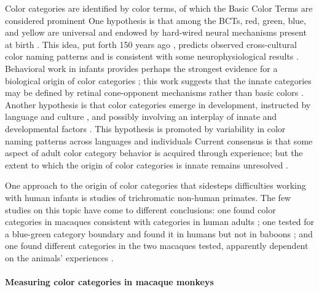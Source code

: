 Color categories are identified by color terms, of which the Basic Color Terms are considered prominent %
One hypothesis is that among the BCTs, red, green, blue, and yellow are universal %
and endowed by hard-wired neural mechanisms present at birth %
. 
This idea, put forth 150 years ago 
, predicts observed cross-cultural color naming patterns %
and is consistent with some neurophysiological results %
. 
Behavioral work in infants provides perhaps the strongest evidence for a biological origin of color categories %
; this work suggests that the innate categories may be defined by retinal cone-opponent mechanisms rather than basic colors %
. 
Another hypothesis is that color categories emerge in development, instructed by language and culture %
, and possibly involving an interplay of innate and developmental factors %
. 
This hypothesis is promoted by variability in color naming patterns across languages and individuals %
Current consensus is that some aspect of adult color category behavior is acquired through experience; but the extent to which the origin of color categories is innate remains unresolved %
. 

One approach to the origin of color categories that sidesteps difficulties working with human infants is studies of trichromatic non-human primates. 
The few studies on this topic have come to different conclusions: one found color categories in macaques consistent with categories in human adults %
; one tested for a blue-green category boundary and found it in humans but not in baboons %
; and one found different categories in the two macaques tested, apparently dependent on the animals’ experiences %
. 


\paragraph{Measuring color categories in macaque monkeys}

